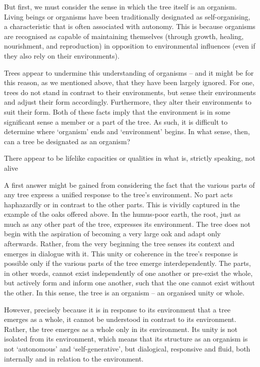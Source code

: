\documentclass[../main.tex]{subfiles}
\begin{document}
\begin{multicols}{2}
{But first, we must consider the sense in which the tree itself is an organism. Living beings or organisms have been traditionally designated as self-organising, a characteristic that is often associated with autonomy. This is because organisms are recognised as capable of maintaining themselves (through growth, healing, nourishment, and reproduction) in opposition to environmental influences (even if they also rely on their environments). 

Trees appear to undermine this understanding of organisms – and it might be for this reason, as we mentioned above, that they have been largely ignored. For one, trees do not stand in contrast to their environments, but sense their environments and adjust their form accordingly. Furthermore, they alter their environments to suit their form. Both of these facts imply that the environment is in some significant sense a member or a part of the tree. As such, it is difficult to determine where ‘organism’ ends and ‘environment’ begins. In what sense, then, can a tree be designated as an organism? 

\begin{pullquote}
 There appear to be lifelike capacities or qualities in what is, strictly speaking, not alive 
\end{pullquote}

A first answer might be gained from considering the fact that the various parts of any tree express a unified response to the tree’s environment. No part acts haphazardly or in contrast to the other parts. This is vividly captured in the example of the oaks offered above. In the humus-poor earth, the root, just as much as any other part of the tree, expresses its environment. The tree does not begin with the aspiration of becoming a very large oak and adapt only afterwards. Rather, from the very beginning the tree senses its context and emerges in dialogue with it. This unity or coherence in the tree’s response is possible only if the various parts of the tree emerge interdependently. The parts, in other words, cannot exist independently of one another or pre-exist the whole, but actively form and inform one another, such that the one cannot exist without the other. In this sense, the tree is an organism – an organised unity or whole. 

However, precisely because it is in response to its environment that a tree emerges as a whole, it cannot be understood in contrast to its environment. Rather, the tree emerges as a whole only in its environment. Its unity is not isolated from its environment, which means that its structure as an organism is not ‘autonomous’ and ‘self-generative’, but dialogical, responsive and fluid, both internally and in relation to the environment. 

}
\end{multicols}
\end{document}
